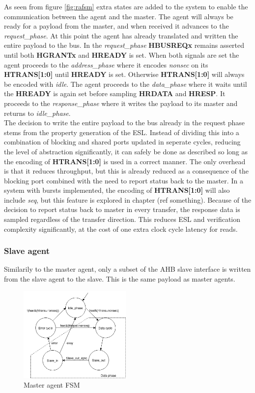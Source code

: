 As seen from figure \ref{fig:rafsm} extra states are added to the system to enable the communication between the agent and the master. The agent will always be ready for a payload from the master, and when received it advances to the \textit{request\_phase}. At this point the agent has already translated and written the entire payload to the bus. In the \textit{request\_phase} \textbf{HBUSREQx} remains asserted until both \textbf{HGRANTx} and \textbf{HREADY} is set. When both signals are set the agent proceeds to the \textit{address\_phase} where it encodes \textit{nonsec} on its \textbf{HTRANS[1:0]} until \textbf{HREADY} is set. Otherwise \textbf{HTRANS[1:0]} will always be encoded with \textit{idle}. The agent proceeds to the \textit{data\_phase} where it waits until the \textbf{HREADY} is again set before sampling \textbf{HRDATA} and \textbf{HRESP}. It proceeds to the \textit{response\_phase} where it writes the payload to its master and returns to \textit{idle\_phase}. \\
\newline
The decision to write the entire payload to the bus already in the request phase stems from the property generation of the ESL. Instead of dividing this into a combination of blocking and shared ports updated in seperate cycles, reducing the level of abstraction significantly, it can safely be done as described so long as the encoding of \textbf{HTRANS[1:0]} is used in a correct manner. The only overhead is that it reduces throughput, but this is already reduced as a consequence of the blocking port combined with the need to report status back to the master. In a system with bursts implemented, the encoding of \textbf{HTRANS[1:0]} will also include \textit{seq}, but this feature is explored in chapter (ref something). Because of the decision to report status back to master in every transfer, the response data is sampled regardless of the transfer direction. This reduces ESL and verification complexity significantly, at the cost of one extra clock cycle latency for reads. 

\subsubsection{Slave agent}
Similarily to the master agent, only a subset of the AHB slave interface is written from the slave agent to the slave. This is the same payload as master agents. 

\begin{figure}
\includegraphics[width=5.5cm]{figs/hw/sAgent_FSM.png}
\caption{Master agent FSM}\label{fig:rsfsm}
\end{figure}  

